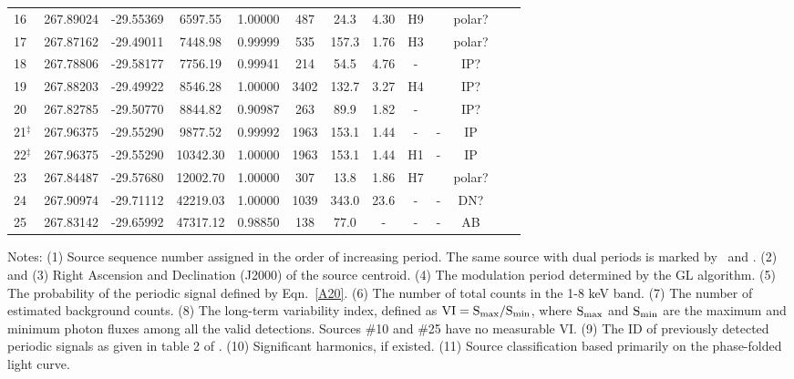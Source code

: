 \documentclass[fleqn,usenatbib]{mnras}
\begin{document}
\begin{table}
\begin{threeparttable}
\begin{tabular}{lcccccccccccc}
\\
16 & 267.89024 &	 -29.55369 & 6597.55 & 1.00000 & 487 & 24.3 & 4.30  & H9  & \text{Second} & polar?
\\ 
17 & 267.87162 &	 -29.49011 & 7448.98 & 0.99999  & 535 & 157.3 & 1.76  & H3 & \text{Second} & polar?
\\
18 & 267.78806 &	 -29.58177 & 7756.19 & 0.99941 & 214 & 54.5 & 4.76 &- &\text{Second} & IP?
\\
19 & 267.88203 &	 -29.49922 & 8546.28 & 1.00000  & 3402  & 132.7 & 3.27 &H4  & \text{Second} & IP?
\\
20 & 267.82785 &	 -29.50770 & 8844.82 & 0.90987 & 263 & 89.9 & 1.82
	&-  & \text{Second} & IP?
\\
21$^\ddag$ & 267.96375 & -29.55290 & 9877.52 & 0.99992  & 1963 & 153.1 & 1.44 & - &- & IP
\\
22$^\ddag$ & 267.96375 & -29.55290 & 10342.30 & 1.00000 & 1963 & 153.1 & 1.44 & H1  &- & IP 
\\
23 & 267.84487 &	 -29.57680 & 12002.70 & 1.00000 & 307 & 13.8 & 1.86 & H7 & \text{Second} & polar?
\\
24 & 267.90974 &	-29.71112 & 42219.03 & 1.00000  &1039 &343.0 &23.6  &- &- & DN?
\\
25 & 267.83142 &	 -29.65992 & 47317.12 & 0.98850 & 138 &77.0  &- &- &- & AB
\\
\hline
\end{tabular}
\begin{tablenotes}
      \small
      \item 
      Notes:
      (1) Source sequence number assigned in the order of increasing period. The same source with dual periods is marked by \dag\ and \ddag. 
(2) and (3) Right Ascension and Declination (J2000) of the source centroid. 
(4) The modulation period determined by the GL algorithm.
(5) The probability of the periodic signal defined by Eqn.~\ref{A20}.  
(6) The number of total counts in the 1-8 keV band.
(7) The number of estimated background counts.
(8) The long-term variability index, defined as $\rm VI=S_{max}/S_{min}$, where $\rm S_{max}$ and $\rm S_{min}$ are the maximum and minimum photon fluxes among all the valid detections. Sources \#10 and \#25 have no measurable VI.
(9) The ID of previously detected periodic signals as given in table 2 of \cite{2012ApJ...746..165H}.
(10) Significant harmonics, if existed.
(11) Source classification based primarily on the phase-folded light curve.
\end{tablenotes}
\end{threeparttable}
\end{table}
\end{document}
